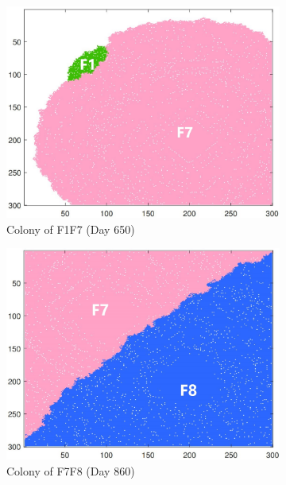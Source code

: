 \documentclass[a4paper,12pt]{article}
\begin{document}
\begin{figure}[H]
	\centering
	\begin{subfigure}{0.3\textwidth}
		\includegraphics[width=\textwidth]{./4/noE_F1F7_650.jpg}
		\caption{Colony of F1F7 (Day 650)}
		\label{noE_F1F7_650}
	\end{subfigure}
	\begin{subfigure}{0.3\textwidth}
		\includegraphics[width=\textwidth]{./4/noE_F7F8_860.jpg}
		\caption{Colony of F7F8 (Day 860)}
		\label{noE_F7F8_860}
	\end{subfigure}
	\begin{subfigure}{0.3\textwidth}

\end{subfigure}
\end{figure}
\end{document}
